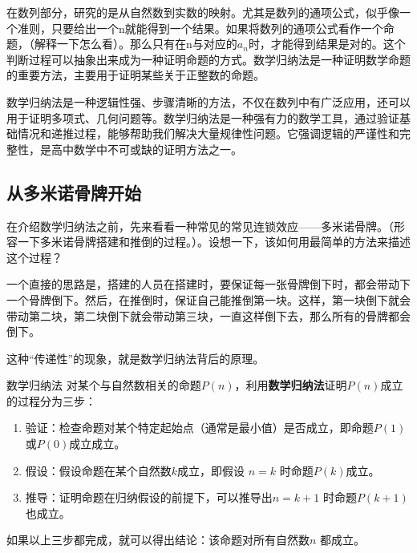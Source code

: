 
\begin{issues}
\issueDraft
\end{issues}



在数列部分，研究的是从自然数到实数的映射。尤其是数列的通项公式，似乎像一个准则，只要给出一个n就能得到一个结果。如果将数列的通项公式看作一个命题，（解释一下怎么看）。那么只有在n与对应的$a_n$时，才能得到结果是对的。这个判断过程可以抽象出来成为一种证明命题的方式。数学归纳法是一种证明数学命题的重要方法，主要用于证明某些关于正整数的命题。

数学归纳法是一种逻辑性强、步骤清晰的方法，不仅在数列中有广泛应用，还可以用于证明多项式、几何问题等。数学归纳法是一种强有力的数学工具，通过验证基础情况和递推过程，能够帮助我们解决大量规律性问题。它强调逻辑的严谨性和完整性，是高中数学中不可或缺的证明方法之一。

\subsection{从多米诺骨牌开始}

在介绍数学归纳法之前，先来看看一种常见的常见连锁效应——多米诺骨牌。（形容一下多米诺骨牌搭建和推倒的过程。）。设想一下，该如何用最简单的方法来描述这个过程？

一个直接的思路是，搭建的人员在搭建时，要保证每一张骨牌倒下时，都会带动下一个骨牌倒下。然后，在推倒时，保证自己能推倒第一块。这样，第一块倒下就会带动第二块，第二块倒下就会带动第三块，一直这样倒下去，那么所有的骨牌都会倒下。

这种“传递性”的现象，就是数学归纳法背后的原理。

\begin{definition}{数学归纳法}
对某个与自然数相关的命题$P(n)$，利用\textbf{数学归纳法}证明$P(n)$成立的过程分为三步：
\begin{enumerate}
\item 验证：检查命题对某个特定起始点（通常是最小值）是否成立，即命题$P(1)$或$P(0)$成立成立。
\item 假设：假设命题在某个自然数$k$成立，即假设 $n = k$ 时命题$P(k)$成立。
\item 推导：证明命题在归纳假设的前提下，可以推导出$n = k+1$ 时命题$P(k+1)$也成立。
\end{enumerate}
如果以上三步都完成，就可以得出结论：该命题对所有自然数$n$ 都成立。
\end{definition}

